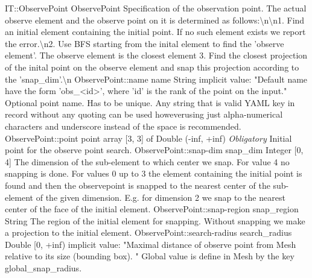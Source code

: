 \begin{RecordType}
	{IT::ObservePoint}
	{ObservePoint}
	{}%
	{}%
	{{{Specification of the observation point.
The actual observe element and the observe point on it is determined as follows:{\textbackslash}n{\textbackslash}n1. Find an initial element containing the initial point.
If no such element exists we report the error.{\textbackslash}n2. Use BFS starting from the inital element to find the 'observe element'. The observe element is the closest element 3. Find the closest projection of the inital point on the observe element and snap this projection according to the 'snap{\_}dim'.{\textbackslash}n}%
}}
		\RecKey
			{ObservePoint::name}
			{name}
			{{String}}{}
			{implicit value: "{Default name have the form 'obs{\_}{\textless}id{\textgreater}', where 'id' is the rank of the point on the input.}"}
			{{{Optional point name.
Has to be unique.
Any string that is valid YAML key in record without any quoting can be used howeverusing just alpha-numerical characters and underscore instead of the space is recommended. }%
}}
		\RecKey
			{ObservePoint::point}
			{point}
			{{array [3, 3] of }{Double (-inf, +inf)}}{}
			{ \it{Obligatory}}
			{{{Initial point for the observe point search.}%
}}
		\RecKey
			{ObservePoint::snap-dim}
			{snap{\_}dim}
			{{Integer [0, 4]}}{}
			{ }
			{{{The dimension of the sub-element to which center we snap.
For value 4 no snapping is done.
For values 0 up to 3 the element containing the initial point is found and then the observepoint is snapped to the nearest center of the sub-element of the given dimension.
E.g. for dimension 2 we snap to the nearest center of the face of the initial element.}%
}}
		\RecKey
			{ObservePoint::snap-region}
			{snap{\_}region}
			{{String}}{}
			{ }
			{{{The region of the initial element for snapping.
Without snapping we make a projection to the initial element.}%
}}
		\RecKey
			{ObservePoint::search-radius}
			{search{\_}radius}
			{{Double [0, +inf)}}{}
			{implicit value: "{Maximal distance of observe point from Mesh relative to its size (bounding box). }"}
			{{{Global value is define in Mesh by the key global{\_}snap{\_}radius.}%
}}
\end{RecordType}
